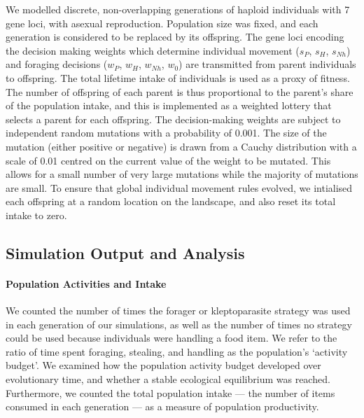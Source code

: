 \documentclass[11pt]{article}
\begin{document}
We modelled discrete, non-overlapping generations of haploid individuals with 7 gene loci, with asexual reproduction.
Population size was fixed, and each generation is considered to be replaced by its offspring.
The gene loci encoding the decision making weights which determine individual movement ($s_P$, $s_H$, $s_{Nh}$) and foraging decisions ($w_P$, $w_H$, $w_{Nh}$, $w_0$) are transmitted from parent individuals to offspring.
The total lifetime intake of individuals is used as a proxy of fitness.
The number of offspring of each parent is thus proportional to the parent's share of the population intake, and this is implemented as a weighted lottery that selects a parent for each offspring.
The decision-making weights are subject to independent random mutations with a probability of 0.001.
The size of the mutation (either positive or negative) is drawn from a Cauchy distribution with a scale of 0.01 centred on the current value of the weight to be mutated.
This allows for a small number of very large mutations while the majority of mutations are small.
To ensure that global individual movement rules evolved, we intialised each offspring at a random location on the landscape, and also reset its total intake to zero.

\subsection{Simulation Output and Analysis}

\paragraph{Population Activities and Intake}

We counted the number of times the forager or kleptoparasite strategy was used in each generation of our simulations, as well as the number of times no strategy could be used because individuals were handling a food item.
We refer to the ratio of time spent foraging, stealing, and handling as the population's `activity budget'.
We examined how the population activity budget developed over evolutionary time, and whether a stable ecological equilibrium was reached.
Furthermore, we counted the total population intake --- the number of items consumed in each generation --- as a measure of population productivity.
\end{document}
